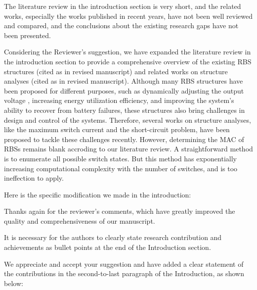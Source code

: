 \begin{revcomment}
  The literature review in the introduction section is very short, and the related works, especially the works published in recent years, have not been well reviewed and compared, and the conclusions about the existing research gaps have not been presented.
\end{revcomment}
\begin{revresponse}

Considering the Reviewer's suggestion, we have expanded the literature review in the introduction section to provide a comprehensive overview of the existing RBS structures (cited as \cite{ci2007novel,9209774,engelhardt2021double,visairoReconfigurableBatteryPack2008,lawsonSoftwareConfigurableBattery2012,he2014reconfiguration,kim2009dynamic} in revised manuscript) and related works on structure analyses (cited as \cite{han2021analysis,chenSneakCircuitTheory2021} in revised manuscript). 
Although many RBS structures have been proposed for different purposes, such as dynamically adjusting the output voltage , increasing energy utilization efficiency, and improving the system's ability to recover from battery failures, these structures also bring challenges in design and control of the systems.
Therefore, several works on structure analyses, like the maximum switch current and the short-circuit problem, have been proposed to tackle these challenges recently.
However, determining the MAC of RBSs remains blank accroding to our literature review.
A straightforward method is to enumerate all possible switch states.
But this method has exponentially increasing computational complexity with the number of switches, and is too ineffection to apply.


Here is the specific modification we made in the introduction:
\begin{changes}
\end{changes}

  
Thanks again for the reviewer's comments, which have greatly improved the quality and comprehensiveness of our manuscript. 
  
\end{revresponse}

\begin{revcomment}
  It is necessary for the authors to clearly state research contribution and achievements as bullet points at the end of the Introduction section.
\end{revcomment}
\begin{revresponse}

We appreciate and accept your suggestion and have added a clear statement of the contributions in the second-to-last paragraph of the Introduction, as shown below:
\begin{changes}
\end{changes}


\end{revresponse}

